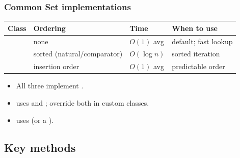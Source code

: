 \documentclass[aspectratio=169,10pt, compress]{beamer}
\begin{document}
\begin{frame}[t,fragile] \frametitle{Common Set implementations}
  \begin{center}\small
  \begin{tabular}{L{0.20\textwidth}L{0.26\textwidth}L{0.16\textwidth}L{0.26\textwidth}}
    \toprule
    \textbf{Class} & \textbf{Ordering}             & \textbf{Time}   & \textbf{When to use} \\
    \midrule
           & none                          & $O(1)$ avg  & default; fast lookup \\
           & sorted (natural/comparator)   & $O(\log n)$ & sorted iteration \\
     & insertion order               & $O(1)$ avg  & predictable order \\
    \bottomrule
  \end{tabular}
  \end{center}
  \vspace{0.3em}
  \begin{itemize}\small
    \item All three implement .
    \item {} uses  and ;
          override both in custom classes.
    \item {} uses  (or a ).
  \end{itemize}
\end{frame}

\subsection[Methods]{Key methods}
\end{document}
